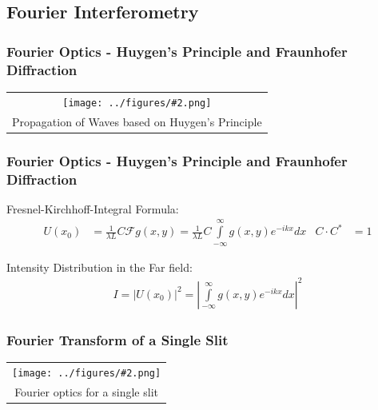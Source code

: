 \documentclass{beamer}
\newcommand{\gra}[3][]{
	\begin{table}
	\centering
	\begin{tabular}[width=\textwidth]{c}
		\texttt{[image: ../figures/\#2.png]}\\
		\small #3
	\end{tabular}
	\end{table}
}
\begin{document}
\subsection{Fourier Interferometry}
\frame{\tableofcontents[currentsubsection]}
\begin{frame}
	\frametitle{Fourier Optics - Huygen's Principle and Fraunhofer Diffraction}
	\gra{Huygen}{Propagation of Waves based on Huygen's Principle \footfullcite{http://web.mit.edu/viz/EM/visualizations/coursenotes/modules/guide14.pdf}}
\end{frame}
\begin{frame}
	\frametitle{Fourier Optics - Huygen's Principle and Fraunhofer Diffraction}
	
	Fresnel-Kirchhoff-Integral Formula:
	\begin{align}
	U(x_0) &= \frac{1}{\lambda L} C \mathscr{F}{g(x, y)}    = \frac{1}{\lambda L} C   \int\limits_{-\infty}^{\infty}  g(x,y)e^{-ikx}dx    &  C  \cdot C^* &= 1                         \label{FKK}
	\end{align}
	
	Intensity Distribution in the Far field:
	\begin{align}
	I=|U(x_0)|^2=\left| \int\limits_{-\infty}^{\infty} g(x,y)e^{-ikx}dx \right|^2
	\end{align}
\end{frame}
\begin{frame}
	\frametitle{Fourier Transform of a Single Slit}
\gra[0.8]{Einzelspalt}{Fourier optics for a single slit \footfullcite{https://www.chem.purdue.edu/courses/chm621/text/ft/basiset/rect/rectangle.gif}}
\end{frame}
\end{document}
